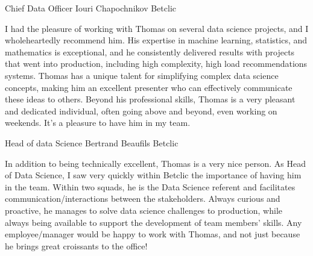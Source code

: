 

\begin{cventries}


\cventry
    {Chief Data Officer} %
    {Iouri Chapochnikov} %
    {Betclic} %
    {} %
    {
    \begin{cvitems}
    I had the pleasure of working with Thomas on several data science projects, and I wholeheartedly recommend him. His expertise in machine learning, statistics, and mathematics is exceptional, and he consistently delivered results with projects that went into production, including high complexity, high load recommendations systems. Thomas has a unique talent for simplifying complex data science concepts, making him an excellent presenter who can effectively communicate these ideas to others. Beyond his professional skills, Thomas is a very pleasant and dedicated individual, often going above and beyond, even working on weekends. It's a pleasure to have him in my team.
\end{cvitems}
    }
    

  \cventry
    {Head of data Science} %
    {Bertrand Beaufils} %
    {Betclic} %
    {} %
    {
    \begin{cvitems}
    In addition to being technically excellent, Thomas is a very nice person.
    As Head of Data Science, I saw very quickly within Betclic the importance of having him in the team.
    Within two squads, he is the Data Science referent and facilitates communication/interactions between the stakeholders.
    Always curious and proactive, he manages to solve data science challenges to production, while always being available to support the development of team members' skills.
    Any employee/manager would be happy to work with Thomas, and not just because he brings great croissants to the office!
    \end{cvitems}
    }


\end{cventries}
